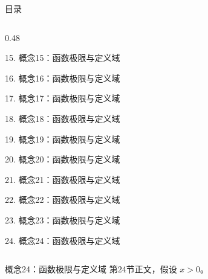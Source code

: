 \documentclass[aspectratio=169,10pt,fontset=fandol]{ctexbeamer}
\begin{document}
\begin{frame}[t,fragile]{目录}
\begin{columns}[T,onlytextwidth]
\begin{column}{0.48\textwidth}
{\color{black}\small 15. 概念15：函数极限与定义域\par}\vspace{0.22em}
{\color{black}\small 16. 概念16：函数极限与定义域\par}\vspace{0.22em}
{\color{black}\small 17. 概念17：函数极限与定义域\par}\vspace{0.22em}
{\color{black}\small 18. 概念18：函数极限与定义域\par}\vspace{0.22em}
{\color{black}\small 19. 概念19：函数极限与定义域\par}\vspace{0.22em}
{\color{black}\small 20. 概念20：函数极限与定义域\par}\vspace{0.22em}
{\color{black}\small 21. 概念21：函数极限与定义域\par}\vspace{0.22em}
{\color{black}\small 22. 概念22：函数极限与定义域\par}\vspace{0.22em}
{\color{black}\small 23. 概念23：函数极限与定义域\par}\vspace{0.22em}
{\color{blue}\small 24. 概念24：函数极限与定义域\par}\vspace{0.22em}
\end{column}
\end{columns}
\end{frame}
\begin{frame}[t,fragile]{概念24：函数极限与定义域}
\normalsize
{\normalsize
第24节正文，假设 $x>0$。
}
\end{frame}
\end{document}
